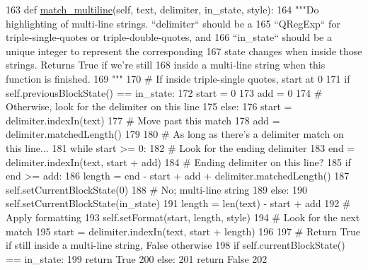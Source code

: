 \begin{DoxyCode}
163     \textcolor{keyword}{def }\hyperlink{classsoftware_1_1chipwhisperer_1_1analyzer_1_1utils_1_1syntaxhighlighter_1_1PythonHighlighter_a547033e018e06d765eea4974f7f7647c}{match\_multiline}(self, text, delimiter, in\_state, style):
164         \textcolor{stringliteral}{"""Do highlighting of multi-line strings. ``delimiter`` should be a}
165 \textcolor{stringliteral}{        ``QRegExp`` for triple-single-quotes or triple-double-quotes, and}
166 \textcolor{stringliteral}{        ``in\_state`` should be a unique integer to represent the corresponding}
167 \textcolor{stringliteral}{        state changes when inside those strings. Returns True if we're still}
168 \textcolor{stringliteral}{        inside a multi-line string when this function is finished.}
169 \textcolor{stringliteral}{        """}
170         \textcolor{comment}{# If inside triple-single quotes, start at 0}
171         \textcolor{keywordflow}{if} self.previousBlockState() == in\_state:
172             start = 0
173             add = 0
174         \textcolor{comment}{# Otherwise, look for the delimiter on this line}
175         \textcolor{keywordflow}{else}:
176             start = delimiter.indexIn(text)
177             \textcolor{comment}{# Move past this match}
178             add = delimiter.matchedLength()
179 
180         \textcolor{comment}{# As long as there's a delimiter match on this line...}
181         \textcolor{keywordflow}{while} start >= 0:
182             \textcolor{comment}{# Look for the ending delimiter}
183             end = delimiter.indexIn(text, start + add)
184             \textcolor{comment}{# Ending delimiter on this line?}
185             \textcolor{keywordflow}{if} end >= add:
186                 length = end - start + add + delimiter.matchedLength()
187                 self.setCurrentBlockState(0)
188             \textcolor{comment}{# No; multi-line string}
189             \textcolor{keywordflow}{else}:
190                 self.setCurrentBlockState(in\_state)
191                 length = len(text) - start + add
192             \textcolor{comment}{# Apply formatting}
193             self.setFormat(start, length, style)
194             \textcolor{comment}{# Look for the next match}
195             start = delimiter.indexIn(text, start + length)
196 
197         \textcolor{comment}{# Return True if still inside a multi-line string, False otherwise}
198         \textcolor{keywordflow}{if} self.currentBlockState() == in\_state:
199             \textcolor{keywordflow}{return} \textcolor{keyword}{True}
200         \textcolor{keywordflow}{else}:
201             \textcolor{keywordflow}{return} \textcolor{keyword}{False}
202 \end{DoxyCode}



